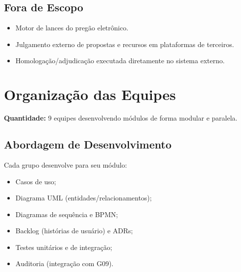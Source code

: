 \documentclass[a4paper,12pt]{article}
\begin{document}
\subsection{Fora de Escopo}
\begin{itemize}
    \item Motor de lances do pregão eletrônico.
    \item Julgamento externo de propostas e recursos em plataformas de terceiros.
    \item Homologação/adjudicação executada diretamente no sistema externo.
\end{itemize}

\section{Organização das Equipes}
\textbf{Quantidade:} 9 equipes desenvolvendo módulos de forma modular e paralela.

\subsection{Abordagem de Desenvolvimento}
Cada grupo desenvolve para seu módulo:
\begin{itemize}
    \item Casos de uso;
    \item Diagrama UML (entidades/relacionamentos);
    \item Diagramas de sequência e BPMN;
    \item Backlog (histórias de usuário) e ADRs;
    \item Testes unitários e de integração;
    \item Auditoria (integração com G09).
\end{itemize}

\newpage
\end{document}
